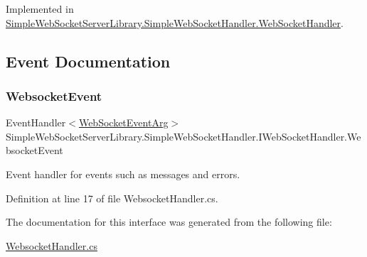Implemented in \mbox{\hyperlink{class_simple_web_socket_server_library_1_1_simple_web_socket_handler_1_1_web_socket_handler_a26ca8d6d9ebbefae58bbdaf3ff7986c4}{Simple\+Web\+Socket\+Server\+Library.\+Simple\+Web\+Socket\+Handler.\+Web\+Socket\+Handler}}.



\subsection{Event Documentation}
\mbox{\label{interface_simple_web_socket_server_library_1_1_simple_web_socket_handler_1_1_i_web_socket_handler_a49e994104add420c0583de677b3cc4b1}} 
\subsubsection{\texorpdfstring{Websocket\+Event}{WebsocketEvent}}
{\footnotesize\ttfamily Event\+Handler$<$\mbox{\hyperlink{class_simple_web_socket_server_library_1_1_web_socket_event_arg}{Web\+Socket\+Event\+Arg}}$>$ Simple\+Web\+Socket\+Server\+Library.\+Simple\+Web\+Socket\+Handler.\+I\+Web\+Socket\+Handler.\+Websocket\+Event}



Event handler for events such as messages and errors. 



Definition at line 17 of file Websocket\+Handler.\+cs.



The documentation for this interface was generated from the following file\+:\begin{DoxyCompactItemize}
\item 
\mbox{\hyperlink{_websocket_handler_8cs}{Websocket\+Handler.\+cs}}\end{DoxyCompactItemize}
